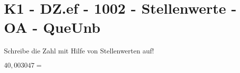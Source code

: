 \section{K1 - DZ.ef - 1002 - Stellenwerte - OA - QueUnb}

\begin{beispiel}{0} %
				Schreibe die Zahl mit Hilfe von Stellenwerten auf!\leer
					
					$40,003047=$ 
\end{beispiel}